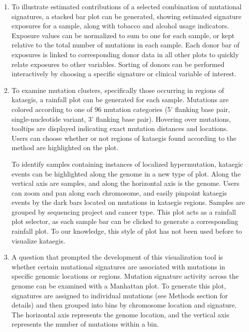\documentclass[12pt, letterpaper]{article}
\begin{document}
\begin{enumerate}
\item To illustrate estimated contributions of a selected combination of mutational signatures, a stacked bar plot can be generated, showing estimated signature exposures for a sample, along with tobacco and alcohol usage indicators.
Exposure values can be normalized to sum to one for each sample, or kept relative to the total number of mutations in each sample.
Each donor bar of exposures is linked to corresponding donor data in all other plots to quickly relate exposures to other variables. 
Sorting of donors can be performed interactively by choosing a specific signature or clinical variable of interest.

\item To examine mutation clusters, specifically those occurring in regions of kataegis, a rainfall plot can be generated for each sample.
Mutations are colored according to one of 96 mutation categories (5' flanking base pair, single-nucleotide variant, 3' flanking base pair).
Hovering over mutations, tooltips are displayed indicating exact mutation distances and locations.
Users can choose whether or not regions of kataegis found according to the \citet{alexandrov2013signatures} method are highlighted on the plot.

To identify samples containing instances of localized hypermutation, kataegic events can be highlighted along the genome in a new type of plot.
Along the vertical axis are samples, and along the horizontal axis is the genome.
Users can zoom and pan along each chromosome, and easily pinpoint kataegis events by the dark bars located on mutations in kataegis regions.
Samples are grouped by sequencing project and cancer type.
This plot acts as a rainfall plot selector, as each sample bar can be clicked to generate a corresponding rainfall plot.
To our knowledge, this style of plot has not been used before to visualize kataegis.

\item A question that prompted the development of this visualization tool is whether certain mutational signatures are associated with mutations in specific genomic locations or regions.
Mutation signature activity across the genome can be examined with a Manhattan plot.
To generate this plot, signatures are assigned to individual mutations (see Methods section for details) and then grouped into bins by chromosome location and signature.
The horizontal axis represents the genome location, and the vertical axis represents the number of mutations within a bin.

\end{enumerate}
\end{document}
